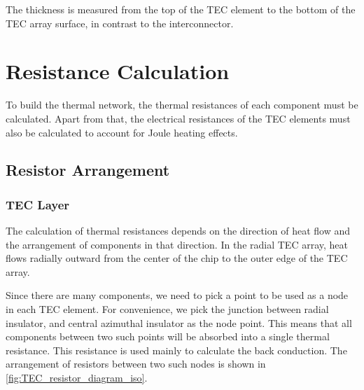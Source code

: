 \documentclass[10pt,a4paper,twocolumn]{article}
\begin{document}
The thickness is measured from the top of the TEC element to the bottom of the TEC array surface, in contrast to the interconnector.

\section{Resistance Calculation}

To build the thermal network, the thermal resistances of each component must be calculated. Apart from that, the electrical resistances of the TEC elements must also be calculated to account for Joule heating effects.

\subsection{Resistor Arrangement}

\subsubsection{TEC Layer}

The calculation of thermal resistances depends on the direction of heat flow and the arrangement of components in that direction. In the radial TEC array, heat flows radially outward from the center of the chip to the outer edge of the TEC array.

Since there are many components, we need to pick a point to be used as a node in each TEC element. For convenience, we pick the junction between radial insulator, and central azimuthal insulator as the node point. This means that all components between two such points will be absorbed into a single thermal resistance. This resistance is used mainly to calculate the back conduction. The arrangement of resistors between two such nodes is shown in \cref{fig:TEC_resistor_diagram_iso}.
\end{document}
